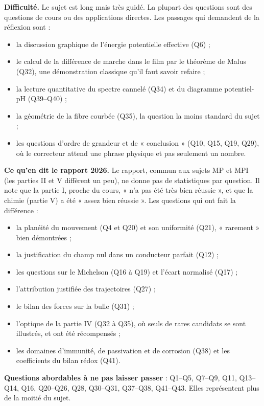 \documentclass[11pt,a4paper]{article}
\providecommand{\tightlist}{\setlength{\itemsep}{0pt}\setlength{\parskip}{0pt}}
\begin{document}
\textbf{Difficulté.} Le sujet est long mais très guidé. La plupart des questions sont des questions de cours ou des applications directes. Les passages qui demandent de la réflexion sont :

\begin{itemize}
\tightlist
\item
  la discussion graphique de l'énergie potentielle effective (Q6) ;
\item
  le calcul de la différence de marche dans le film par le théorème de Malus (Q32), une démonstration classique qu'il faut savoir refaire ;
\item
  la lecture quantitative du spectre cannelé (Q34) et du diagramme potentiel-pH (Q39--Q40) ;
\item
  la géométrie de la fibre courbée (Q35), la question la moins standard du sujet ;
\item
  les questions d'ordre de grandeur et de « conclusion » (Q10, Q15, Q19, Q29), où le correcteur attend une phrase physique et pas seulement un nombre.
\end{itemize}

\textbf{Ce qu'en dit le rapport 2026.} Le rapport, commun aux sujets MP et MPI (les parties II et V diffèrent un peu), ne donne pas de statistiques par question. Il note que la partie I, proche du cours, « n'a pas été très bien réussie », et que la chimie (partie V) a été « assez bien réussie ». Les questions qui ont fait la différence :

\begin{itemize}
\tightlist
\item
  la planéité du mouvement (Q4 et Q20) et son uniformité (Q21), « rarement » bien démontrées ;
\item
  la justification du champ nul dans un conducteur parfait (Q12) ;
\item
  les questions sur le Michelson (Q16 à Q19) et l'écart normalisé (Q17) ;
\item
  l'attribution justifiée des trajectoires (Q27) ;
\item
  le bilan des forces sur la bulle (Q31) ;
\item
  l'optique de la partie IV (Q32 à Q35), où seuls de rares candidats se sont illustrés, et ont été récompensés ;
\item
  les domaines d'immunité, de passivation et de corrosion (Q38) et les coefficients du bilan rédox (Q41).
\end{itemize}

\textbf{Questions abordables à ne pas laisser passer} : Q1--Q5, Q7--Q9, Q11, Q13--Q14, Q16, Q20--Q26, Q28, Q30--Q31, Q37--Q38, Q41--Q43. Elles représentent plus de la moitié du sujet.
\end{document}
